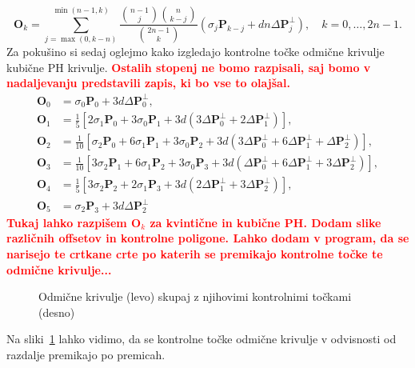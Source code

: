 \documentclass[isrm2, tisk]{fmfdelo}
\newcommand{\mycomment}[1]{\textbf{\textcolor{red}{#1}}}
\begin{document}
    \[\mathbf{O}_k= \sum_{j=\max(0,k-n)}^{\min(n-1,k)} \frac{\binom{n-1}{j}\binom{n}{k-j} }{\binom{2n-1}{k}}(\sigma_j\mathbf{P}_{k-j} + dn\Delta \mathbf{P}_j^{\perp}),\quad k=0,\ldots,2n-1.        \]
    Za pokušino si sedaj oglejmo kako izgledajo kontrolne točke odmične krivulje kubične PH krivulje.
    \mycomment{Ostalih stopenj ne bomo razpisali, saj bomo v nadaljevanju predstavili zapis, ki bo vse to olajšal.}
    \begin{align*}
        \mathbf{O}_0 &= \sigma_0\mathbf{P}_0+3d\Delta\mathbf{P}_0^{\perp},  \\
        \mathbf{O}_1 &= \frac{1}{5} \left[ 2\sigma_1\mathbf{P}_0+ 3\sigma_0\mathbf{P}_1 + 3d(3\Delta\mathbf{P}_0^{\perp} + 2\Delta\mathbf{P}_1^{\perp})\right], \\
        \mathbf{O}_2 &= \frac{1}{10} \left[\sigma_2\mathbf{P}_0+ 6\sigma_1\mathbf{P}_1 + 3\sigma_0\mathbf{P}_2 + 3d(3\Delta\mathbf{P}_0^{\perp} + 6\Delta\mathbf{P}_1^{\perp}+\Delta\mathbf{P}_2^{\perp})\right], \\
        \mathbf{O}_3 &= \frac{1}{10} \left[3\sigma_2\mathbf{P}_1+ 6\sigma_1\mathbf{P}_2 + 3\sigma_0\mathbf{P}_3 + 3d(\Delta\mathbf{P}_0^{\perp} + 6\Delta\mathbf{P}_1^{\perp}+3\Delta\mathbf{P}_2^{\perp})\right], \\
        \mathbf{O}_4 &= \frac{1}{5} \left[3\sigma_2\mathbf{P}_2+ 2\sigma_1\mathbf{P}_3 + 3d(2\Delta\mathbf{P}_1^{\perp} + 3\Delta\mathbf{P}_2^{\perp})\right], \\
        \mathbf{O}_5 &= \sigma_2\mathbf{P}_3+3d\Delta\mathbf{P}_2^{\perp}
    \end{align*}
    \mycomment{Tukaj lahko razpišem $\mathbf{O}_k$ za kvintične in kubične PH.
    Dodam slike različnih offsetov in kontrolne poligone.
    Lahko dodam v program, da se narisejo te crtkane crte po katerih se premikajo kontrolne točke te odmične krivulje...}
    \begin{figure}[h]
        \centering
        \qquad
        \caption{Odmične krivulje (levo) skupaj z njihovimi kontrolnimi točkami (desno)}
        \label{fig:kontrolne-točke-offset}
    \end{figure}
    Na sliki~\ref{fig:kontrolne-točke-offset} lahko vidimo, da se kontrolne točke odmične krivulje v odvisnosti od razdalje premikajo po premicah.
\end{document}
